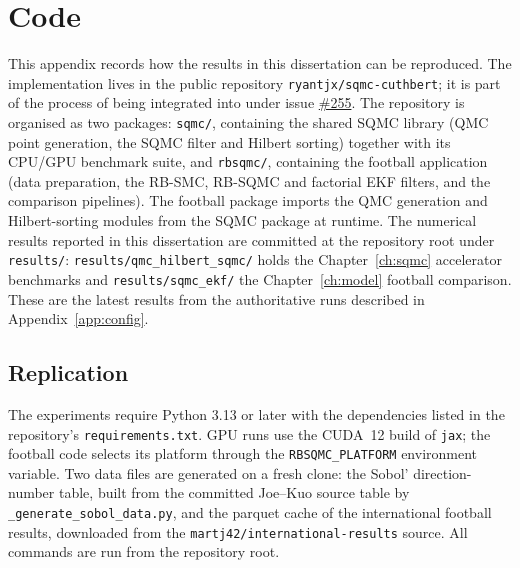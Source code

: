 \chapter{Code}
\label{app:code}

This appendix records how the results in this dissertation can be reproduced. The implementation lives in the public repository \texttt{ryantjx/sqmc-cuthbert}; it is part of the process of being integrated into \texttt{} under issue \href{https://github.com/state-space-models/cuthbert/issues/255}{\#255}. The repository is organised as two packages: \texttt{sqmc/}, containing the shared SQMC library (QMC point generation, the SQMC filter and Hilbert sorting) together with its CPU/GPU benchmark suite, and \texttt{rbsqmc/}, containing the football application (data preparation, the RB-SMC, RB-SQMC and factorial EKF filters, and the comparison pipelines). The football package imports the QMC generation and Hilbert-sorting modules from the SQMC package at runtime. The numerical results reported in this dissertation are committed at the repository root under \texttt{results/}: \texttt{results/qmc\_hilbert\_sqmc/} holds the Chapter~\ref{ch:sqmc} accelerator benchmarks and \texttt{results/sqmc\_ekf/} the Chapter~\ref{ch:model} football comparison. These are the latest results from the authoritative runs described in Appendix~\ref{app:config}.



\section{Replication}
\label{app:replication}

The experiments require Python 3.13 or later with the dependencies listed in the repository's \texttt{requirements.txt}. GPU runs use the CUDA~12 build of \texttt{jax}; the football code selects its platform through the \texttt{RBSQMC\_PLATFORM} environment variable. Two data files are generated on a fresh clone: the Sobol' direction-number table, built from the committed Joe--Kuo source table by \texttt{\_generate\_sobol\_data.py}, and the parquet cache of the international football results, downloaded from the \texttt{martj42/international-results} source. All commands are run from the repository root.

